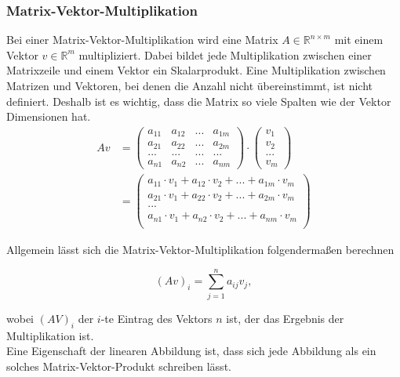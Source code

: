 \subsubsection{Matrix-Vektor-Multiplikation}
Bei einer Matrix-Vektor-Multiplikation wird eine Matrix $A \in  \mathbb{R}^{n \times m}$ mit einem Vektor $v \in \mathbb{R}^m$ multipliziert. Dabei bildet jede Multiplikation zwischen einer Matrixzeile und einem Vektor ein Skalarprodukt. Eine Multiplikation zwischen Matrizen und Vektoren, bei denen die Anzahl nicht übereinstimmt, ist nicht definiert. Deshalb ist es wichtig, dass die Matrix so viele Spalten wie der Vektor Dimensionen hat.
\begin{align*}
	Av &= 
	\left(
   \begin{array}{cccc}
	  a_{11} & a_{12} & ... & a_{1m}\\
		a_{21} & a_{22} & ... & a_{2m}\\
		...   & ...   & ... & ...  \\
		a_{n1} & a_{n2} & ... & a_{nm}
	 \end{array}
	\right) 
	\cdot 
	\left(
	 \begin{array}{c}
	  v_1\\
		v_2\\
		...\\
		v_m
	 \end{array}
	\right)\\
	&= \left(
	 \begin{array}{c}
	 a_{11} \cdot v_1 + a_{12} \cdot v_2 + ... + a_{1m} \cdot v_m\\
	 a_{21} \cdot v_1 + a_{22} \cdot v_2 + ... + a_{2m} \cdot v_m\\
		...\\
	 a_{n1} \cdot v_1 + a_{n2} \cdot v_2 + ... + a_{nm} \cdot v_m\\
	 \end{array}
	\right)
\end{align*}

Allgemein lässt sich die Matrix-Vektor-Multiplikation folgendermaßen berechnen

\begin{equation*}
(Av)_i = \sum_{j=1}^{n}a_{ij}v_j ,
\end{equation*}

wobei $(AV)_i$ der $i$-te Eintrag des Vektors $n$ ist, der das Ergebnis der Multiplikation ist.\\
Eine Eigenschaft der linearen Abbildung ist, dass sich jede Abbildung als ein solches Matrix-Vektor-Produkt schreiben lässt. 

